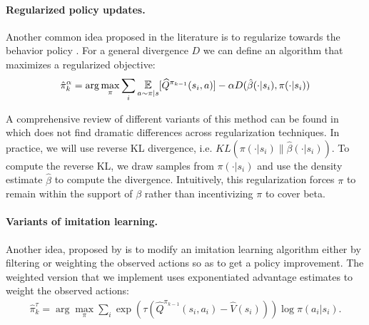 


\paragraph{Regularized policy updates.}
Another common idea proposed in the literature is to regularize towards the behavior policy \citep{wu2019behavior, jaques2019way, kumar2019stabilizing, ma2019imitation}. For a general divergence $ D$ we can define an algorithm that maximizes a regularized objective:
\begin{align}
    \hat \pi^\alpha_k = \arg\max_\pi \sum_{i}  \E_{a\sim \pi|s}[\widehat Q^{\pi_{k-1}}(s_i, a)] - \alpha D(\hat \beta(\cdot|s_i), \pi(\cdot|s_i))
\end{align}

A comprehensive review of different variants of this method can be found in \cite{wu2019behavior} which does not find dramatic differences across regularization techniques.
In practice, we will use reverse KL divergence,  i.e. $ KL( \pi(\cdot|s_i) \| \hat \beta(\cdot|s_i))$.
To compute the reverse KL, we draw samples from $ \pi(\cdot |s_i)$ and use the density estimate $ \hat \beta$ to compute the divergence. Intuitively, this regularization forces $ \pi$ to remain within the support of $ \beta$ rather than incentivizing $ \pi$ to cover beta.


\paragraph{Variants of imitation learning.}
Another idea, proposed by \citep{wang2018exponentially, Siegel2020Keep, wang2020critic, chen2020bail} is to modify an imitation learning algorithm either by filtering or weighting the observed actions so as to get a policy improvement. The weighted version that we implement uses exponentiated advantage estimates to weight the observed actions:
\begin{align}
    \hat \pi^\tau_k = \arg\max_\pi \sum_{i}  \exp(\tau (\widehat Q^{\pi_{k-1}}(s_i, a_i) - \widehat V(s_i))) \log \pi(a_i|s_i).
\end{align}

